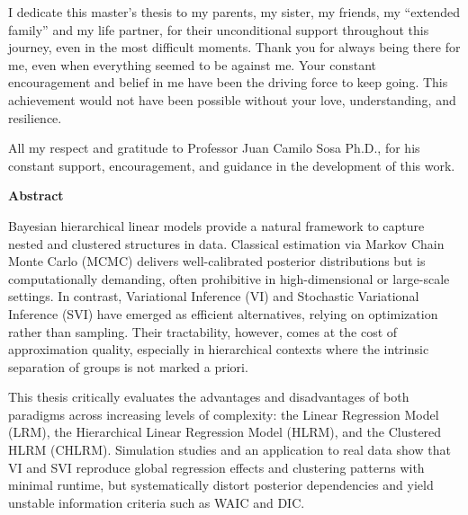     \begin{flushright}
    \begin{minipage}{8cm}
        \noindent
            \small
           I dedicate this master's thesis to my parents, my sister, my friends, my ``extended family'' and my life partner, for their unconditional support throughout this journey, even in the most difficult moments. Thank you for always being there for me, even when everything seemed to be against me. Your constant encouragement and belief in me have been the driving force to keep going. This achievement would not have been possible without your love, understanding, and resilience.\\
    \end{minipage}
    \end{flushright}

\vspace{5cm}

    All my respect and gratitude to Professor Juan Camilo Sosa Ph.D., for his constant support, encouragement, and guidance in the development of this work.\\


\newpage
{}
\textbf{\LARGE Abstract}

Bayesian hierarchical linear models provide a natural framework to capture nested and clustered structures in data. Classical estimation via Markov Chain Monte Carlo (MCMC) delivers well-calibrated posterior distributions but is computationally demanding, often prohibitive in high-dimensional or large-scale settings. In contrast, Variational Inference (VI) and Stochastic Variational Inference (SVI) have emerged as efficient alternatives, relying on optimization rather than sampling. Their tractability, however, comes at the cost of approximation quality, especially in hierarchical contexts where the intrinsic separation of groups is not marked a priori.   

\vspace{0.5 cm}

This thesis critically evaluates the advantages and disadvantages of both paradigms across increasing levels of complexity: the Linear Regression Model (LRM), the Hierarchical Linear Regression Model (HLRM), and the Clustered HLRM (CHLRM). Simulation studies and an application to real data show that VI and SVI reproduce global regression effects and clustering patterns with minimal runtime, but systematically distort posterior dependencies and yield unstable information criteria such as WAIC and DIC.  

